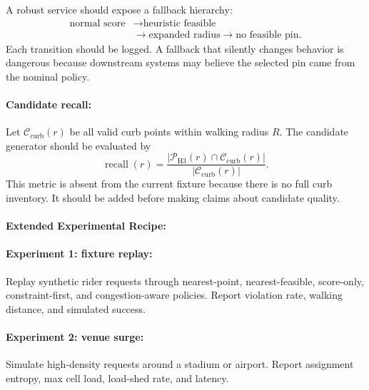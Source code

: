 \documentclass{article}
\begin{document}
A robust service should expose a fallback hierarchy:
\begin{equation}
\begin{aligned}
\text{normal score}&\rightarrow\text{heuristic feasible}\\
&\rightarrow\text{expanded radius}\rightarrow\text{no feasible pin}.
\end{aligned}
\end{equation}
Each transition should be logged. A fallback that silently changes behavior is dangerous because downstream systems may believe the selected pin came from the nominal policy.

\paragraph{Candidate recall:}

Let $\mathcal{C}_{\text{curb}}(r)$ be all valid curb points within walking radius $R$. The candidate generator should be evaluated by
\begin{equation}
  \operatorname{recall}(r)=
  \frac{|\mathcal{P}_{\text{H3}}(r)\cap\mathcal{C}_{\text{curb}}(r)|}
  {|\mathcal{C}_{\text{curb}}(r)|}.
\end{equation}
This metric is absent from the current fixture because there is no full curb inventory. It should be added before making claims about candidate quality.

\paragraph{Extended Experimental Recipe:}

\paragraph{Experiment 1: fixture replay:}

Replay synthetic rider requests through nearest-point, nearest-feasible, score-only, constraint-first, and congestion-aware policies. Report violation rate, walking distance, and simulated success.

\paragraph{Experiment 2: venue surge:}

Simulate high-density requests around a stadium or airport. Report assignment entropy, max cell load, load-shed rate, and latency.
\end{document}
